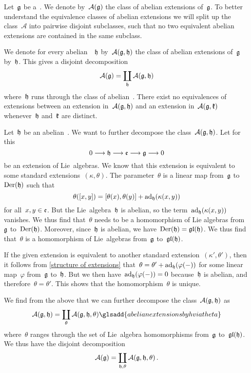 \begin{fluff}
	\label{discussing abelian extensions}
	Let~$\mathfrak{g}$ be a~\liealgebra{$\kf$}.
	We denote by~$\mathcal{A}(\mathfrak{g})$ the class of abelian extensions of~$\mathfrak{g}$.
	To better understand the equivalence classes of abelian extensions we will split up the class~$\mathcal{A}$ into pairwise disjoint subclasses, such that no two equivalent abelian extensions are contained in the same subclass.

	We denote for every abelian~\liealgebra{$\kf$}~$\mathfrak{h}$ by~$\mathcal{A}(\mathfrak{g}, \mathfrak{h})$ the class of abelian extensions of~$\mathfrak{g}$ by~$\mathfrak{h}$.
	This gives a disjoint decomposition
	\[
		\mathcal{A}(\mathfrak{g})
		=
		\coprod_{\mathfrak{h}}
		\mathcal{A}(\mathfrak{g}, \mathfrak{h})
	\]
	where~$\mathfrak{h}$ runs through the class of abelian~\liealgebras{$\kf$}.
	There exist no equivalences of extensions between an extension in~$\mathcal{A}(\mathfrak{g}, \mathfrak{h})$ and an extension in~$\mathcal{A}(\mathfrak{g}, \mathfrak{k})$ whenever~$\mathfrak{h}$ and~$\mathfrak{k}$ are distinct.

	Let~$\mathfrak{h}$ be an abelian~\liealgebra{$\kf$}.
	We want to further decompose the class~$\mathcal{A}(\mathfrak{g}, \mathfrak{h})$.
	Let for this
	\[
		0 \to \hlie \to \elie \to \glie \to 0
	\]
	be an extension of Lie~algebras.
	We know that this extension is equivalent to some standard extensions~$(\kappa, \theta)$.
	The parameter~$\theta$ is a linear map from~$\mathfrak{g}$ to~$\operatorname{Der}(\mathfrak{h})$ such that
	\[
		\theta( [x,y] )
		=
		[ \theta(x), \theta(y) ] + \operatorname{ad}_{\mathfrak{h}}( \kappa(x,y) )
	\]
	for all~$x, y \in \mathfrak{e}$.
	But the Lie~algebra~$\mathfrak{h}$ is abelian, so the term~$\operatorname{ad}_{\mathfrak{h}}( \kappa(x,y) )$ vanishes.
	We thus find that~$\theta$ needs to be a homomorphism of Lie algebras from~$\mathfrak{g}$ to~$\operatorname{Der}(\mathfrak{h})$.
	Moreover, since~$\mathfrak{h}$ is abelian, we have~$\operatorname{Der}(\mathfrak{h}) = \mathfrak{gl}(\mathfrak{h})$.
	We thus find that~$\theta$ is a homomorphism of Lie~algebras from~$\mathfrak{g}$ to~$\mathfrak{gl}(\mathfrak{h})$.

	If the given extension is equivalent to another standard extension~$(\kappa', \theta')$, then it follows from \cref{structure of extensions} that~$\theta = \theta' + \operatorname{ad}_{\mathfrak{h}}(\varphi(-))$ for some linear map~$\varphi$ from~$\mathfrak{g}$ to~$\mathfrak{h}$.
	But we then have~$\operatorname{ad}_{\mathfrak{h}}(\varphi(-)) = 0$ because~$\mathfrak{h}$ is abelian, and therefore~$\theta = \theta'$.
	This shows that the homomorphism~$\theta$ is unique.

	We find from the above that we can further decompose the class~$\mathcal{A}(\mathfrak{g}, \mathfrak{h})$ as
	\[
		\AbEx(\glie, \hlie)
		=
		\coprod_{\theta}
		\AbEx(\glie, \hlie, \theta)
		\glsadd{abelian extensions by h via theta}
	\]
	where~$\theta$ ranges through the set of Lie~algebra homomorphisms from~$\mathfrak{g}$ to~$\mathfrak{gl}(\mathfrak{h})$.
	We thus have the disjoint decomposition
	\[
		\mathcal{A}(\mathfrak{g})
		=
		\coprod_{\mathfrak{h}, \theta}
		\mathcal{A}(\mathfrak{g}, \mathfrak{h}, \theta) \,.
	\]


\end{fluff}
